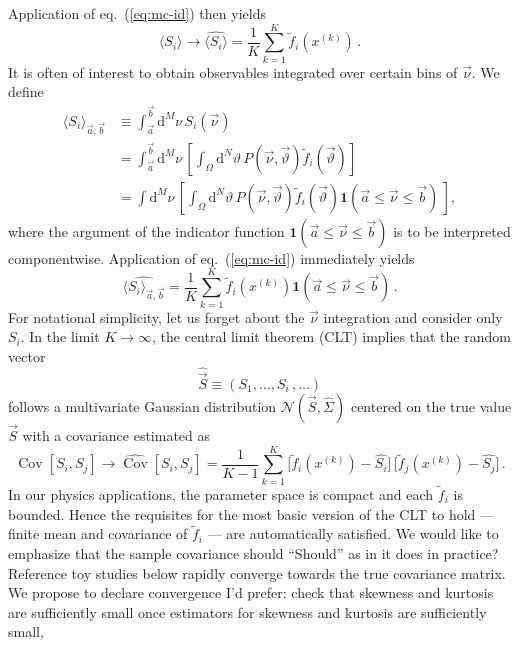 \documentclass[aps,prd,reprint,nofootinbib,preprintnumbers]{revtex4}
\newcommand{\dual}[1]{\tilde{#1}}
\newcommand{\est}[1]{\widehat{#1}}
\newcommand{\nuvec}{\vec{\nu}}
\newcommand{\refeq}[1]{eq.~(\ref{eq:#1})}
\newcommand{\rmdx}[1]{\mbox{d} #1 \,} %
\newcommand{\thvec}{\vec{\vartheta}}
\renewcommand{\theta}{\vartheta}
\newcommand{\vecest}[1]{\widehat{\vec{#1}}}
\DeclareMathOperator{\cov}{Cov}
\newcommand{\fred}[1]{{\color{brown!85!black}#1}}
\begin{document}
Application of \refeq{mc-id} then yields
\begin{equation}
    \langle S_i\rangle \to \widehat{\langle S_i\rangle} = \frac{1}{K} \sum_{k=1}^{K} \dual{f}_i(x^{(k)})\,.
\end{equation}
It is often of interest to obtain observables integrated over certain
bins of $\nuvec$. We define
\begin{align}
    \langle S_i\rangle_{\vec{a},\vec{b}}
    & \equiv \int_{\vec{a}}^{\vec{b}} \rmdx{^M \nu} S_i(\nuvec)\\
    & = \int_{\vec{a}}^{\vec{b}} \rmdx{^M \nu} \left[\int_{\Omega} \rmdx{^N\theta} P(\nuvec,\thvec) \dual{f}_i(\thvec)  \right]\\
    & = \int \rmdx{^M \nu} \left[\int_{\Omega} \rmdx{^N\theta}  P(\nuvec,\thvec) \dual{f}_i(\thvec)
        \mathbf{1}(\vec{a} \le \nuvec \le \vec{b})\,
        \right],
\end{align}
where the argument of the indicator function $ \mathbf{1}(\vec{a} \le
\nuvec \le \vec{b})$ is to be interpreted componentwise.
Application of \refeq{mc-id} immediately yields
\begin{equation}
    \label{eq:bin-importance}
    \widehat{\langle S_i\rangle_{\vec{a},\vec{b}}}
    = \frac{1}{K} \sum_{k=1}^{K} \dual{f}_i(x^{(k)})         \mathbf{1}(\vec{a} \le \nuvec \le \vec{b})\,.
\end{equation}
For notational simplicity, let us forget about the $\nuvec$
integration and consider only $S_i$. In the limit $K \to \infty$, the
central limit theorem (CLT) implies that the random vector
\begin{equation}
  \label{eq:angular-obs-vec}
  \vecest{S} \equiv (S_1, \dots, S_i\,,
  \dots)
\end{equation}
follows a multivariate Gaussian distribution $\mathcal{N}( \vec{S},
\widehat{\Sigma})$ centered on the true value $\vec{S}$ with a
covariance estimated as
\begin{equation}
    \cov[S_i,S_j] \to \est{\cov}[{S}_i, {S}_j]
        = \frac{1}{K - 1} \sum_{k=1}^{K} \big[\dual{f}_i(x^{(k)}) - \est{ S_i}\big]\,\big[\dual{f}_j(x^{(k)}) - \widehat{ S_j}\big]\,.
\end{equation}
In our physics applications, the parameter space is compact and each
$\dual{f}_i$ is bounded. Hence the requisites for the most basic
version of the CLT to hold --- finite mean and covariance of
$\dual{f}_i$ --- are automatically satisfied.  We would like to
emphasize that the sample covariance should \fred{``Should'' as in it
  does in practice? Reference toy studies below} rapidly converge
towards the true covariance matrix.  We propose to declare convergence
\fred{I'd prefer: check that skewness and kurtosis are sufficiently
  small} once estimators for skewness and kurtosis are sufficiently
small,
\end{document}
